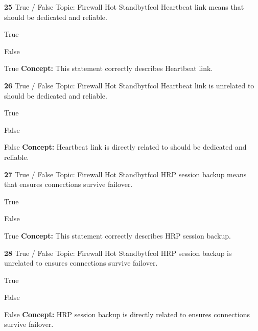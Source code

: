 \documentclass[10pt,a4paper]{article}
\begin{document}
\begin{qcard}{\color{white}\textbf{25} \hfill \small True / False \textbar{} Topic: Firewall Hot Standby}{tfcol}
Heartbeat link means that should be dedicated and reliable.

\begin{qoptions}
\item True
\item False
\end{qoptions}
\begin{explainbox}{True}
\textbf{Concept:} This statement correctly describes Heartbeat link.
\end{explainbox}
\end{qcard}

\begin{qcard}{\color{white}\textbf{26} \hfill \small True / False \textbar{} Topic: Firewall Hot Standby}{tfcol}
Heartbeat link is unrelated to should be dedicated and reliable.

\begin{qoptions}
\item True
\item False
\end{qoptions}
\begin{explainbox}{False}
\textbf{Concept:} Heartbeat link is directly related to should be dedicated and reliable.
\end{explainbox}
\end{qcard}

\begin{qcard}{\color{white}\textbf{27} \hfill \small True / False \textbar{} Topic: Firewall Hot Standby}{tfcol}
HRP session backup means that ensures connections survive failover.

\begin{qoptions}
\item True
\item False
\end{qoptions}
\begin{explainbox}{True}
\textbf{Concept:} This statement correctly describes HRP session backup.
\end{explainbox}
\end{qcard}

\begin{qcard}{\color{white}\textbf{28} \hfill \small True / False \textbar{} Topic: Firewall Hot Standby}{tfcol}
HRP session backup is unrelated to ensures connections survive failover.

\begin{qoptions}
\item True
\item False
\end{qoptions}
\begin{explainbox}{False}
\textbf{Concept:} HRP session backup is directly related to ensures connections survive failover.
\end{explainbox}
\end{qcard}
\end{document}
